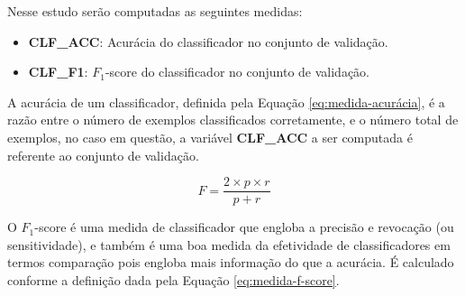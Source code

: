         Nesse estudo serão computadas as seguintes medidas:
        \begin{itemize}
            \item \textbf{CLF\_ACC}: Acurácia do classificador no conjunto de validação.
            \item \textbf{CLF\_F1}: $F_1$-score do classificador no conjunto de validação.
        \end{itemize}
        A acurácia de um classificador, definida pela Equação \ref{eq:medida-acurácia}, é a razão entre o número de exemplos classificados corretamente, e o número total de exemplos, no caso em questão, a variável \textbf{CLF\_ACC} a ser computada é referente ao conjunto de validação.

            \begin{equation}
                \label{eq:medida-f-score}
        		F = 
        		\frac{2 \times p \times r}{p + r}
            \end{equation}

        O $F_1$-score é uma medida de classificador que engloba a precisão e revocação (ou sensitividade), e também é uma boa medida da efetividade de classificadores em termos comparação pois engloba mais informação do que a acurácia. 
        É calculado conforme a definição dada pela Equação \ref{eq:medida-f-score}.

        \noindent\begin{minipage}{.5\textwidth}
        \end{minipage}
        